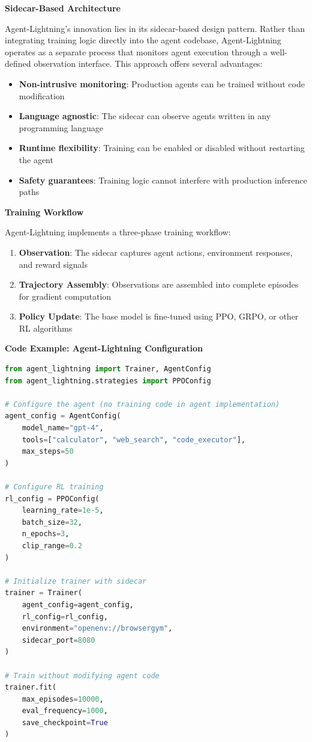 \textbf{Sidecar-Based Architecture}

Agent-Lightning's innovation lies in its sidecar-based design pattern. Rather than integrating training logic directly into the agent codebase, Agent-Lightning operates as a separate process that monitors agent execution through a well-defined observation interface. This approach offers several advantages:

\begin{itemize}
    \item \textbf{Non-intrusive monitoring}: Production agents can be trained without code modification
    \item \textbf{Language agnostic}: The sidecar can observe agents written in any programming language
    \item \textbf{Runtime flexibility}: Training can be enabled or disabled without restarting the agent
    \item \textbf{Safety guarantees}: Training logic cannot interfere with production inference paths

\end{itemize}
\textbf{Training Workflow}

Agent-Lightning implements a three-phase training workflow:

\begin{enumerate}
    \item \textbf{Observation}: The sidecar captures agent actions, environment responses, and reward signals
    \item \textbf{Trajectory Assembly}: Observations are assembled into complete episodes for gradient computation
    \item \textbf{Policy Update}: The base model is fine-tuned using PPO, GRPO, or other RL algorithms

\end{enumerate}
\textbf{Code Example: Agent-Lightning Configuration}

\begin{lstlisting}[language=Python]
from agent_lightning import Trainer, AgentConfig
from agent_lightning.strategies import PPOConfig

# Configure the agent (no training code in agent implementation)
agent_config = AgentConfig(
    model_name="gpt-4",
    tools=["calculator", "web_search", "code_executor"],
    max_steps=50
)

# Configure RL training
rl_config = PPOConfig(
    learning_rate=1e-5,
    batch_size=32,
    n_epochs=3,
    clip_range=0.2
)

# Initialize trainer with sidecar
trainer = Trainer(
    agent_config=agent_config,
    rl_config=rl_config,
    environment="openenv://browsergym",
    sidecar_port=8080
)

# Train without modifying agent code
trainer.fit(
    max_episodes=10000,
    eval_frequency=1000,
    save_checkpoint=True
)
\end{lstlisting}

